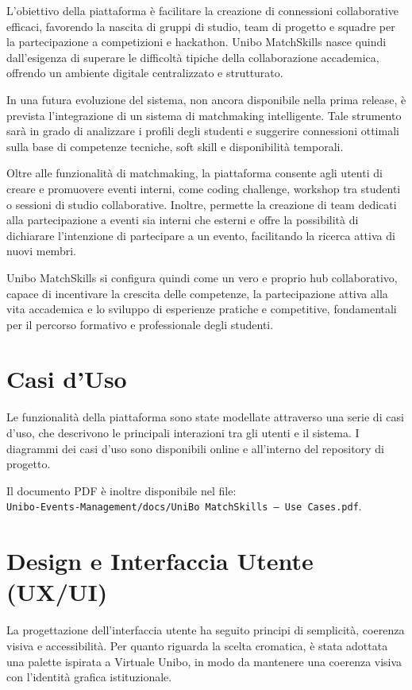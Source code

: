 \documentclass[a4paper,12pt]{article}
\begin{document}
L’obiettivo della piattaforma è facilitare la creazione di connessioni collaborative efficaci, favorendo la nascita di gruppi di studio, team di progetto e squadre per la partecipazione a competizioni e hackathon. Unibo MatchSkills nasce quindi dall’esigenza di superare le difficoltà tipiche della collaborazione accademica, offrendo un ambiente digitale centralizzato e strutturato.

In una futura evoluzione del sistema, non ancora disponibile nella prima release, è prevista l’integrazione di un sistema di matchmaking intelligente. Tale strumento sarà in grado di analizzare i profili degli studenti e suggerire connessioni ottimali sulla base di competenze tecniche, soft skill e disponibilità temporali.

Oltre alle funzionalità di matchmaking, la piattaforma consente agli utenti di creare e promuovere eventi interni, come coding challenge, workshop tra studenti o sessioni di studio collaborative. Inoltre, permette la creazione di team dedicati alla partecipazione a eventi sia interni che esterni e offre la possibilità di dichiarare l’intenzione di partecipare a un evento, facilitando la ricerca attiva di nuovi membri.

Unibo MatchSkills si configura quindi come un vero e proprio hub collaborativo, capace di incentivare la crescita delle competenze, la partecipazione attiva alla vita accademica e lo sviluppo di esperienze pratiche e competitive, fondamentali per il percorso formativo e professionale degli studenti.

\section{Casi d’Uso}

Le funzionalità della piattaforma sono state modellate attraverso una serie di casi d’uso, che descrivono le principali interazioni tra gli utenti e il sistema. I diagrammi dei casi d’uso sono disponibili online e all’interno del repository di progetto.

Il documento PDF è inoltre disponibile nel file:\\
\texttt{Unibo-Events-Management/docs/UniBo MatchSkills – Use Cases.pdf}.

\section{Design e Interfaccia Utente (UX/UI)}

La progettazione dell’interfaccia utente ha seguito principi di semplicità, coerenza visiva e accessibilità. Per quanto riguarda la scelta cromatica, è stata adottata una palette ispirata a Virtuale Unibo, in modo da mantenere una coerenza visiva con l’identità grafica istituzionale.
\end{document}

